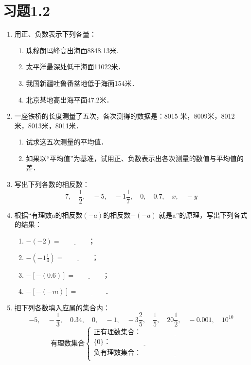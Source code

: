 \section*{习题1.2}
\begin{enumerate}
    \item 用正、负数表示下列各量：
    \begin{enumerate}
        \item 珠穆朗玛峰高出海面8848.13米.
        \item 太平洋最深处低于海面11022米．
        \item 我国新疆吐鲁番盆地低于海面154米．
        \item 北京某地高出海平面47.2米．
    \end{enumerate}
    \item 一座铁桥的长度测量了五次，各次测得的数据是：8015
    米，8009米，8012米，8013米，8011米．
    \begin{enumerate}
        \item 试求这五次测量的平均值．
        \item 如果以“平均值”为基准，试用正、负数表示出各次测量的数值与平均值的差．
    \end{enumerate}
\item 写出下列各数的相反数：
\[7,\quad \frac{1}{2},\quad -5,\quad -1\frac{1}{7},\quad 0,\quad 0.7,\quad x,\quad -y  \]
\item 根据“有理数a的相反数$(- a)$的相反数$-(-a)$
就是a”的原理，写出下列各式的结果：
 \begin{enumerate}
     \item $-(-2)=\underline{\qquad\qquad}$；
     \item $-\left(-1\frac{1}{4}\right)=\underline{\qquad\qquad}$；
     \item $-[-(0.6)]=\underline{\qquad\qquad}$；
     \item $-[-(-m)]=\underline{\qquad\qquad}$．
 \end{enumerate}
\item 把下列各数填入应属的集合内：
\[-5,\quad -\frac{1}{3},\quad 0.34,\quad 0,\quad -1,\quad -3\frac{2}{5},\quad \frac{1}{5},\quad 20\frac{1}{2},\quad -0.001,\quad 10^{10} \]
\[\text{有理数集合}\begin{cases}
    \text{正有理数集合：}\underline{\qquad\qquad\qquad\qquad\qquad}\\
    \{0\}： \underline{\qquad\qquad\qquad\qquad\qquad}\\    
    \text{负有理数集合：}\underline{\qquad\qquad\qquad\qquad\qquad}\\
\end{cases}\]



\end{enumerate}
